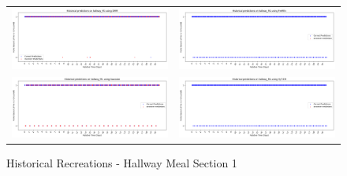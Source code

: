 \begin{figure}
  \begin{tabular}{cc}
    {\includegraphics[width = 3in]{images/results/Historical_hallway_M1_DMM.png}} &
    {\includegraphics[width = 3in]{images/results/Historical_hallway_M1_FreMEn.png}} \\
    {\includegraphics[width = 3in]{images/results/Historical_hallway_M1_Gaussian.png}} &
    {\includegraphics[width = 3in]{images/results/Historical_hallway_M1_HyT-EM.png}} \\
  \end{tabular}
  \caption{Historical Recreations - Hallway Meal Section 1}
\end{figure}

